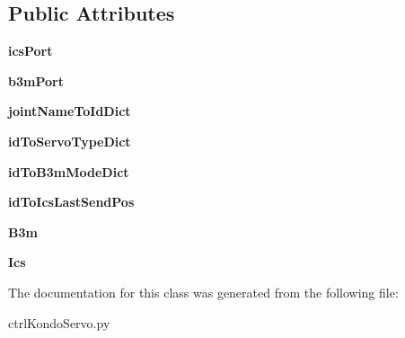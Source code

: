 \subsection*{Public Attributes}
\begin{DoxyCompactItemize}
\item 
{\bfseries ics\+Port}\hypertarget{classkondoServoLib_1_1ctrlKondoServo_1_1ctrlKondoServoClass_a23932f86ffca0a44ffb4f4d1eb76fe7d}{}\label{classkondoServoLib_1_1ctrlKondoServo_1_1ctrlKondoServoClass_a23932f86ffca0a44ffb4f4d1eb76fe7d}

\item 
{\bfseries b3m\+Port}\hypertarget{classkondoServoLib_1_1ctrlKondoServo_1_1ctrlKondoServoClass_a7bf60306d45b4fc8e545bf890db01f1c}{}\label{classkondoServoLib_1_1ctrlKondoServo_1_1ctrlKondoServoClass_a7bf60306d45b4fc8e545bf890db01f1c}

\item 
{\bfseries joint\+Name\+To\+Id\+Dict}\hypertarget{classkondoServoLib_1_1ctrlKondoServo_1_1ctrlKondoServoClass_a10192ad62812e223dc06f78f332c8557}{}\label{classkondoServoLib_1_1ctrlKondoServo_1_1ctrlKondoServoClass_a10192ad62812e223dc06f78f332c8557}

\item 
{\bfseries id\+To\+Servo\+Type\+Dict}\hypertarget{classkondoServoLib_1_1ctrlKondoServo_1_1ctrlKondoServoClass_abab034fba95ef3a6c074af8799ddd3a2}{}\label{classkondoServoLib_1_1ctrlKondoServo_1_1ctrlKondoServoClass_abab034fba95ef3a6c074af8799ddd3a2}

\item 
{\bfseries id\+To\+B3m\+Mode\+Dict}\hypertarget{classkondoServoLib_1_1ctrlKondoServo_1_1ctrlKondoServoClass_a7b265836bb5f9b888ed6745eff1f9f09}{}\label{classkondoServoLib_1_1ctrlKondoServo_1_1ctrlKondoServoClass_a7b265836bb5f9b888ed6745eff1f9f09}

\item 
{\bfseries id\+To\+Ics\+Last\+Send\+Pos}\hypertarget{classkondoServoLib_1_1ctrlKondoServo_1_1ctrlKondoServoClass_a78cf91e3cd0c329c98590322f1fc6f0e}{}\label{classkondoServoLib_1_1ctrlKondoServo_1_1ctrlKondoServoClass_a78cf91e3cd0c329c98590322f1fc6f0e}

\item 
{\bfseries B3m}\hypertarget{classkondoServoLib_1_1ctrlKondoServo_1_1ctrlKondoServoClass_afde3561fccfb416aac22502c54b67397}{}\label{classkondoServoLib_1_1ctrlKondoServo_1_1ctrlKondoServoClass_afde3561fccfb416aac22502c54b67397}

\item 
{\bfseries Ics}\hypertarget{classkondoServoLib_1_1ctrlKondoServo_1_1ctrlKondoServoClass_a9bd75eb55622512c776b500ede5e96be}{}\label{classkondoServoLib_1_1ctrlKondoServo_1_1ctrlKondoServoClass_a9bd75eb55622512c776b500ede5e96be}

\end{DoxyCompactItemize}


The documentation for this class was generated from the following file\+:\begin{DoxyCompactItemize}
\item 
ctrl\+Kondo\+Servo.\+py\end{DoxyCompactItemize}
